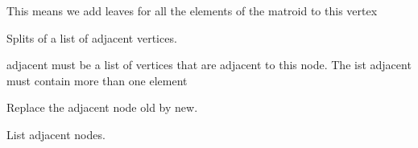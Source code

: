 \documentclass[letterpaper,12pt,english]{sphinxmanual}
\begin{document}
\begin{fulllineitems}
\begin{fulllineitems}
\sphinxAtStartPar
This means we add leaves for all the elements of the matroid to this vertex

\end{fulllineitems}


\begin{fulllineitems}
\label{\detokenize{api/modules:cbmpy.fluxmodules.decomposition.Vertex.splitOff}}
\pysigstartsignatures
\pysiglinewithargsret
{}
{}
{}
\pysigstopsignatures
\sphinxAtStartPar
Splits of a list of adjacent vertices.

\sphinxAtStartPar
adjacent must be a list of vertices that are adjacent to this node. The ist
adjacent must contain more than one element

\end{fulllineitems}


\begin{fulllineitems}
\label{\detokenize{api/modules:cbmpy.fluxmodules.decomposition.Vertex.replaceAdjacent}}
\pysigstartsignatures
\pysiglinewithargsret
{}
{\sphinxparamcomma {}}
{}
\pysigstopsignatures
\sphinxAtStartPar
Replace the adjacent node old by new.

\end{fulllineitems}


\begin{fulllineitems}
\label{\detokenize{api/modules:cbmpy.fluxmodules.decomposition.Vertex.getAdjacent}}
\pysigstartsignatures
\pysiglinewithargsret
{}
{}
{}
\pysigstopsignatures
\sphinxAtStartPar
List adjacent nodes.

\end{fulllineitems}



\end{fulllineitems}
\end{document}
